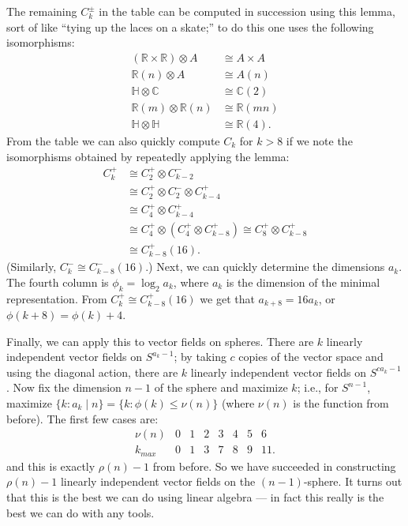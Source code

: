 \documentclass{article}
\newcommand{\C}{\mathbb{C}}
\newcommand{\R}{\mathbb{R}}
\begin{document}
The remaining $C_k^\pm$ in the table can be computed in succession using this lemma, sort of like ``tying up the laces on a skate;'' to do this one uses the following isomorphisms:
\begin{align*}
(\R \times \R) \otimes A & \cong A \times A \\
\R(n) \otimes A & \cong A(n) \\
\mathbb{H} \otimes \C & \cong \C(2) \\
\R(m) \otimes \R(n) & \cong \R(mn) \\
\mathbb{H} \otimes \mathbb{H} & \cong \R(4).
\end{align*}
From the table we can also quickly compute $C_k$ for $k > 8$ if we note the isomorphisms obtained by repeatedly applying the lemma:
\begin{align*}
C_k^+ & \cong C_2^+ \otimes C_{k-2}^- \\
& \cong C_2^+ \otimes C_2^- \otimes C^+_{k-4} \\
& \cong C_4^+ \otimes C_{k-4}^+ \\
& \cong C_4^+ \otimes (C_4^+ \otimes C_{k-8}^+) \cong C_8^+ \otimes C_{k-8}^+ \\
& \cong C_{k-8}^+(16).
\end{align*}
(Similarly, $C_k^- \cong C_{k-8}^-(16)$.)  Next, we can quickly determine the dimensions $a_k$.  The fourth column is $\phi_k = \log_2 a_k$, where $a_k$ is the dimension of the minimal representation.  From $C_k^+ \cong C_{k-8}^+(16)$ we get that $a_{k+8} = 16 a_k$, or $\phi(k + 8) = \phi(k) + 4$. %

Finally, we can apply this to vector fields on spheres.  There are $k$ linearly independent vector fields on $S^{a_k - 1}$; by taking $c$ copies of the vector space and using the diagonal action, there are $k$ linearly independent vector fields on $S^{ca_k - 1}$.  Now fix the dimension $n-1$ of the sphere and maximize $k$; i.e., for $S^{n-1}$, maximize $\{k : a_k \mid n\} = \{ k : \phi(k) \le \nu(n)\}$ (where $\nu(n)$ is the function from before).  The first few cases are:
\[\begin{array}{c|ccccccc}
\nu(n) & 0 & 1 & 2 & 3 & 4 & 5 & 6 \\
\hline
k_{max} & 0 & 1 & 3 & 7 & 8 & 9 & 11.
\end{array}\]
and this is exactly $\rho(n) - 1$ from before.  So we have succeeded in constructing $\rho(n) - 1$ linearly independent vector fields on the $(n-1)$-sphere.  It turns out that this is the best we can do using linear algebra --- in fact this really is the best we can do with any tools.
\end{document}

